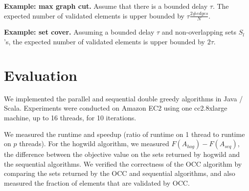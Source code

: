 \documentclass{article} %
\begin{document}
\textbf{Example: max graph cut.}
Assume that there is a bounded delay $\tau$.
The expected number of validated elements is upper bounded by $\tau \frac{2\#edges}{N}$.

\textbf{Example: set cover.}
Assuming a bounded delay $\tau$ and non-overlapping sets $S_l$'s, the expected number of validated elements is upper bounded by $2\tau$.

















\section{Evaluation}

We implemented the parallel and sequential double greedy algorithms in Java / Scala.
Experiments were conducted on Amazon EC2 using one cc2.8xlarge machine, up to 16 threads, for 10 iterations.

We measured the runtime and speedup (ratio of runtime on 1 thread to runtime on $p$ threads).
For the hogwild algorithm, we measured $F(A_{hog})-F(A_{seq})$, the difference between the objective value on the sets returned by hogwild and the sequential algorithms.
We verified the correctness of the OCC algorithm by comparing the sets returned by the OCC and sequential algorithms, and also measured the fraction of elements that are validated by OCC.

\end{document}

